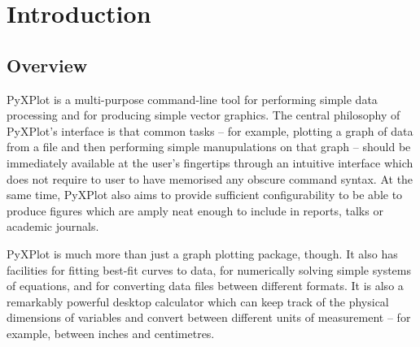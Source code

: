 %
%
%
%
%



\chapter{Introduction} 

\label{introduction}

\section{Overview}

{\sc PyXPlot} is a multi-purpose command-line tool for performing simple data
processing and for producing simple vector graphics. The central philosophy of
PyXPlot's interface is that common tasks -- for example, plotting a graph of
data from a file and then performing simple manupulations on that graph --
should be immediately available at the user's fingertips through an intuitive
interface which does not require to user to have memorised any obscure command
syntax.  At the same time, PyXPlot also aims to provide sufficient
configurability to be able to produce figures which are amply neat enough to
include in reports, talks or academic journals.

PyXPlot is much more than just a graph plotting package, though. It also has
facilities for fitting best-fit curves to data, for numerically solving simple
systems of equations, and for converting data files between different formats.
It is also a remarkably powerful desktop calculator which can keep track of the
physical dimensions of variables and convert between different units of
measurement -- for example, between inches and centimetres.

